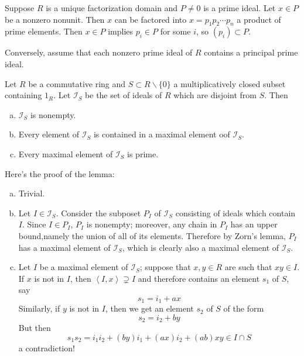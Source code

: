 \begin{answer}
    Suppose $R$ is a unique factorization domain and $P\neq 0$ is a prime ideal. Let $x\in P$ be a nonzero nonunit. Then $x$ can be factored into $x=p_{1}p_{2}\cdots p_{n}$ a product of prime elements. Then $x\in P$ implies $p_{i}\in P$ for some $i$, so $(p_{i})\subset P$.

    Conversely, assume that each nonzero prime ideal of $R$ contains a principal prime ideal.

    \begin{lemma}
        Let $R$ be a commutative ring and $S\subset R\backslash \{0\}$ a multiplicatively closed subset containing $1_{R}$. Let $\mathcal{I}_{S}$ be the set of ideals of $R$ which are disjoint from $S$. Then
        \begin{enumerate}[(a)]
            \item $\mathcal{I}_{S}$ is nonempty.
            \item Every element of $\mathcal{I}_{S}$ is contained in a maximal element oof $\mathcal{I}_{S}$.
            \item Every maximal element of $\mathcal{I}_{S}$ is prime.
        \end{enumerate}
    \end{lemma}
    
    Here's the proof of the lemma:
    \begin{enumerate}[(a)]
        \item Trivial.
        \item Let $I\in \mathcal{I}_{S}$. Consider the subposet $P_{I}$ of $\mathcal{I}_{S}$ consisting of ideals which contain $I$. Since $I\in P_{I}$, $P_{I}$ is nonempty; moreover, any chain in $P_{I}$ has an upper bound,namely the union of all of its elements. Therefore by Zorn's lemma, $P_{I}$ has a maximal element of $\mathcal{I}_{S}$, which is clearly also a maximal element of $\mathcal{I}_{S}$. 
        \item Let $I$ be a maximal element of $\mathcal{I}_{S}$; suppose that $x,y\in R$ are such that $xy\in I$. If $x$ is not in $I$, then $\left\langle I,x\right\rangle\supsetneq I$ and therefore contains an element $s_{1}$ of $S$, say \[s_{1}=i_{1}+ax\] Similarly, if $y$ is not in $I$, then we get an element $s_{2}$ of $S$ of the form \[s_{2}=i_{2}+by\] But then \[s_{1}s_{2}=i_{1}i_{2}+(by)i_{1}+(ax)i_{2}+(ab)xy\in I\cap S\] a contradiction! 
    \end{enumerate}


\end{answer}
